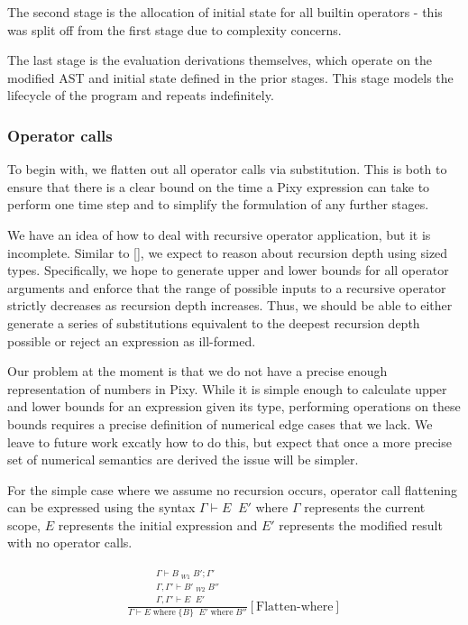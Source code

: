 \documentclass{scrartcl}
\DeclareMathOperator{\where}{where}
\DeclareMathOperator{\flattenrel}{\overset{flatten}{\Rightarrow}}
\begin{document}
    The second stage is the allocation of initial state for all builtin operators - this was split off from the first stage due to complexity concerns.
    
    The last stage is the evaluation derivations themselves, which operate on the modified AST and initial state defined in the prior stages. This stage models the lifecycle of the program and repeats indefinitely.
    
    \subsubsection{Operator calls}
    
    To begin with, we flatten out all operator calls via substitution. This is both to ensure that there is a clear bound on the time a Pixy expression can take to perform one time step and to simplify the formulation of any further stages.
    
    We have an idea of how to deal with recursive operator application, but it is incomplete. Similar to [], we expect to reason about recursion depth using sized types. Specifically, we hope to generate upper and lower bounds for all operator arguments and enforce that the range of possible inputs to a recursive operator strictly decreases as recursion depth increases. Thus, we should be able to either generate a series of substitutions equivalent to the deepest recursion depth possible or reject an expression as ill-formed.
    
    Our problem at the moment is that we do not have a precise enough representation of numbers in Pixy. While it is simple enough to calculate upper and lower bounds for an expression given its type, performing operations on these bounds requires a precise definition of numerical edge cases that we lack. We leave to future work excatly how to do this, but expect that once a more precise set of numerical semantics are derived the issue will be simpler.
    
    For the simple case where we assume no recursion occurs, operator call flattening can be expressed using the syntax $\Gamma \vdash E \flattenrel E'$ where $\Gamma$ represents the current scope, $E$ represents the initial expression and $E'$ represents the modified result with no operator calls.
    
    \begin{align*}
    \frac{
        \begin{matrix}
        \Gamma \vdash B \flattenrel_{W1} B'; \Gamma' \\
        \Gamma, \Gamma' \vdash B' \flattenrel_{W2} B'' \\
        \Gamma, \Gamma' \vdash E \flattenrel E'
        \end{matrix}
    }{
        \Gamma \vdash E \where \{ B \} \flattenrel E' \where B''
    }[\text{Flatten-where}]
    \end{align*}
    
\end{document}
